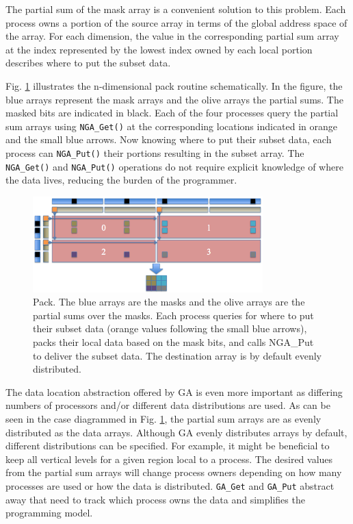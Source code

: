 The partial sum of the mask array is a convenient solution to this problem.
Each process owns a portion of the source array in terms of the global address
space of the array.  For each dimension, the value in the corresponding
partial sum array at the index represented by the lowest index owned by each
local portion describes where to put the subset data.

Fig. \ref{fig:pack} illustrates the n-dimensional pack routine schematically.
In the figure, the blue arrays represent the mask arrays and the olive arrays
the partial sums.  The masked bits are indicated in black.  Each of the four
processes query the partial sum arrays using \verb=NGA_Get()= at the
corresponding locations indicated in orange and the small blue arrows.  Now
knowing where to put their subset data, each process can \verb=NGA_Put()=
their portions resulting in the subset array.  The \verb=NGA_Get()= and
\verb=NGA_Put()= operations do not require explicit knowledge of where the
data lives, reducing the burden of the programmer.

\begin{figure}[!t]
\center
\includegraphics[width=3.5in]{images/pack}
\caption{Pack.  The blue arrays are the masks and the olive arrays are the
partial sums over the masks.  Each process queries for where to put their
subset data (orange values following the small blue arrows), packs their local
data based on the mask bits, and calls NGA\_Put to deliver the subset data.
The destination array is by default evenly distributed.}
\label{fig:pack}
\end{figure}

The data location abstraction offered by GA is even more important as
differing numbers of processors and/or different data distributions are used.
As can be seen in the case diagrammed in Fig. \ref{fig:pack}, the partial sum
arrays are as evenly distributed as the data arrays.  Although GA evenly
distributes arrays by default, different distributions can be specified.  For
example, it might be beneficial to keep all vertical levels for a given region
local to a process.  The desired values from the partial sum arrays will
change process owners depending on how many processes are used or how the data
is distributed.  \verb+GA_Get+ and \verb+GA_Put+ abstract away that need to
track which process owns the data and simplifies the programming model.
